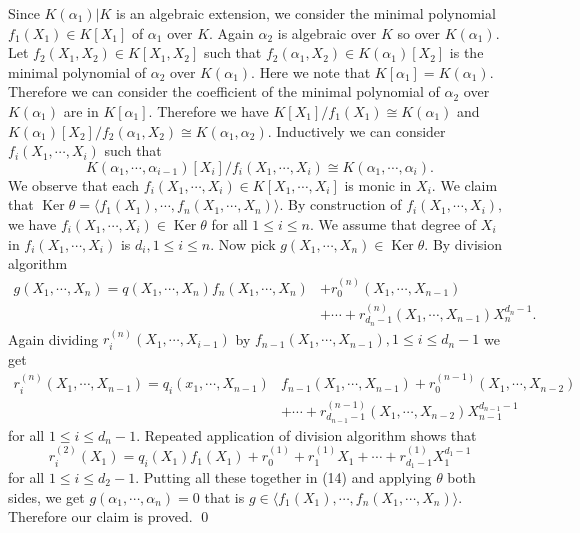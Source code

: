 \documentclass[11pt]{amsart}
\newcommand{\gen}[1]{\langle#1\rangle}
\DeclareMathOperator{\Ker}{\text{Ker}}
\begin{document}
\proof Since $K(\alpha_1)|K$ is an algebraic extension, we consider the minimal polynomial $f_1(X_1)\in K[X_1]$ of $\alpha_1$ over $K.$ Again $\alpha_2$ is algebraic over $K$ so over $K(\alpha_1).$ Let $f_2(X_1,X_2)\in K[X_1,X_2]$ such that $f_2(\alpha_1,X_2)\in K(\alpha_1)[X_2]$ is the minimal polynomial of $\alpha_2$ over $K(\alpha_1).$ Here we note that $K[\alpha_1]=K(\alpha_1).$ Therefore we can consider the coefficient of the minimal polynomial of $\alpha_2$ over $K(\alpha_1)$ are in $K[\alpha_1].$ Therefore we have $K[X_1]/f_1(X_1)\cong K(\alpha_1)$ and $K(\alpha_1)[X_2]/f_2(\alpha_1,X_2)\cong K(\alpha_1,\alpha_2).$ Inductively we can consider $f_i(X_1,\cdots,X_i)$ such that $$K(\alpha_1,\cdots,\alpha_{i-1})[X_i]/f_i(X_1,\cdots,X_i)\cong K(\alpha_1,\cdots,\alpha_i).$$ We observe that each $f_i(X_1,\cdots,X_i)\in K[X_1,\cdots,X_i]$ is monic in $X_i.$ We claim that $\Ker\theta=\gen{f_1(X_1),\cdots,f_n(X_1,\cdots,X_n)}.$ By construction of $f_i(X_1,\cdots,X_i),$ we have $f_i(X_1,\cdots,X_i)\in\Ker\theta$ for all $1\leq i\leq n.$ We assume that degree of $X_i$ in $f_i(X_1,\cdots,X_i)$ is $d_i,1\leq i\leq n.$ Now pick $g(X_1,\cdots,X_n)\in\Ker\theta.$ By division algorithm \begin{align}
g(X_1,\cdots,X_n)=q(X_1,\cdots,X_n)f_n(X_1,\cdots,X_n)&+r^{(n)}_0(X_1,\cdots,X_{n-1})\\
&+\cdots+r^{(n)}_{d_n-1}(X_1,\cdots,X_{n-1})X_n^{d_n-1}\nonumber.
\end{align}
Again dividing $r^{(n)}_i(X_1,\cdots,X_{i-1})$ by $f_{n-1}(X_1,\cdots,X_{n-1}),1\leq i\leq d_n-1$ we get \begin{align*}
r^{(n)}_i(X_1,\cdots,X_{n-1})=q_i(x_1,\cdots,X_{n-1})&f_{n-1}(X_1,\cdots,X_{n-1})+r^{(n-1)}_0(X_1,\cdots,X_{n-2})\\
&+\cdots+r^{(n-1)}_{d_{n-1}-1}(X_1,\cdots,X_{n-2})X_{n-1}^{d_{n-1}-1}
\end{align*}
for all $1\leq i\leq d_n-1.$ Repeated application of division algorithm shows that $$r^{(2)}_i(X_1)=q_i(X_1)f_1(X_1)+r_0^{(1)}+r_1^{(1)}X_1+\cdots+r_{d_1-1}^{(1)}X_1^{d_1-1}$$ for all $1\leq i\leq d_2-1.$ Putting all these together in (14) and applying $\theta$ both sides, we get $g(\alpha_1,\cdots,\alpha_n)=0$ that is $g\in \gen{f_1(X_1),\cdots,f_n(X_1,\cdots,X_n)}.$ Therefore our claim is proved. \qed
\end{document}
